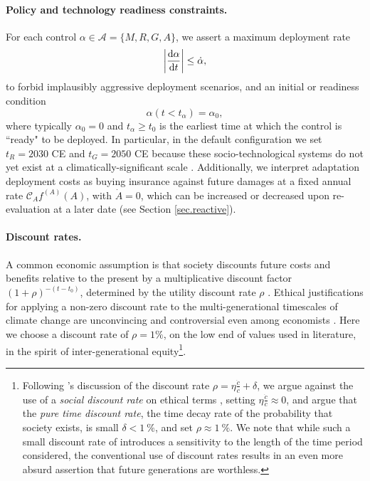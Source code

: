 \documentclass{article}
\begin{document}
\paragraph{Policy and technology readiness constraints.} For each control $\alpha \in \mathcal{A} = \{ M, R, G, A\}$, we assert a maximum deployment rate
\begin{equation}
    \abs{\dv{\alpha}{t}} \le \dot{\alpha},
\end{equation}
to forbid implausibly aggressive deployment scenarios, and an initial or readiness condition
\begin{equation}
    \alpha(t < t_{\alpha}) = \alpha_{0},
\end{equation} where typically $\alpha_{0} = 0$ and $t_{\alpha} \ge t_{0}$ is the earliest time at which the control is ``ready" to be deployed. In particular, in the default configuration we set $t_{R} = 2030$ CE and $t_{G} = 2050$ CE because these socio-technological systems do not yet exist at a climatically-significant scale \citep{minx_negative_2018, flegal_solar_2019}. Additionally, we interpret adaptation deployment costs as buying insurance against future damages at a fixed annual rate $\mathcal{C}_{A} f^{(A)}(A)$, with $\dot{A} = 0$, which can be increased or decreased upon re-evaluation at a later date (see Section \ref{sec.reactive}).

\paragraph{Discount rates.} A common economic assumption is that society discounts future costs and benefits relative to the present by a multiplicative discount factor $(1 + \rho)^{-(t-t_{0})}$, determined by the utility discount rate $\rho$ \citep[e.g. see reviews in][]{broome_discounting_1994, stern_economics_2007}. Ethical justifications for applying a non-zero discount rate to the multi-generational timescales of climate change are unconvincing and controversial even among economists \citep{ramsey_mathematical_1928, solow_economics_1974, stern_economics_2007}. Here we choose a discount rate of $\rho = 1\%$, on the low end of values used in literature, in the spirit of inter-generational equity\footnote{Following \cite{stern_economics_2007}'s discussion of the discount rate $\rho = \eta \frac{\dot{c}}{c} + \delta$, we argue against the use of a \textit{social discount rate} on ethical terms \citep{ramsey_mathematical_1928, solow_economics_1974}, setting $\eta \frac{\dot{c}}{c} \approx 0$, and argue that the \textit{pure time discount rate}, the time decay rate of the probability that society exists, is small $\delta < \SI{1}{\%}$, and set $\rho \approx \SI{1}{\%}$. We note that while such a small discount rate of introduces a sensitivity to the length of the time period considered, the conventional use of discount rates results in an even more absurd assertion that future generations are worthless.}. 
\end{document}
